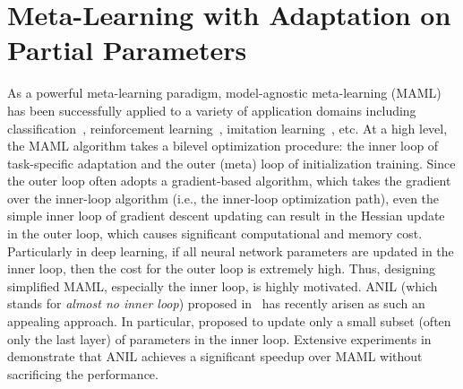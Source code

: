 \documentclass{osudissert96}
\begin{document}
\section{Meta-Learning with  Adaptation on Partial Parameters} 



As a powerful meta-learning paradigm, model-agnostic meta-learning (MAML)~\cite{finn2017model} has been successfully applied to a variety of application domains including classification~\cite{rajeswaran2019meta}, reinforcement learning~\cite{finn2017model}, imitation learning~\cite{finn2017one}, etc.  
At a high level, the MAML algorithm takes a bilevel optimization procedure: the inner loop of task-specific adaptation and the outer (meta) loop of initialization training. Since the outer loop often adopts a gradient-based algorithm, which takes the gradient over the inner-loop algorithm (i.e., the inner-loop optimization path), even the simple inner loop of gradient descent updating can result in the Hessian update in the outer loop, which causes significant computational and memory cost. Particularly in deep learning, if all neural network parameters are updated in the inner loop, then the cost for the outer loop is extremely high. Thus, designing simplified MAML, especially the inner loop, is highly motivated. ANIL (which stands for {\em almost no inner loop}) proposed in~\cite{raghu2019rapid} has recently arisen as such an appealing approach. In particular,
\cite{raghu2019rapid} proposed to update only a small subset (often only the last layer) of parameters in the inner loop. Extensive experiments  in \cite{raghu2019rapid} demonstrate that ANIL achieves a significant speedup over MAML without sacrificing the performance.  
\end{document}
